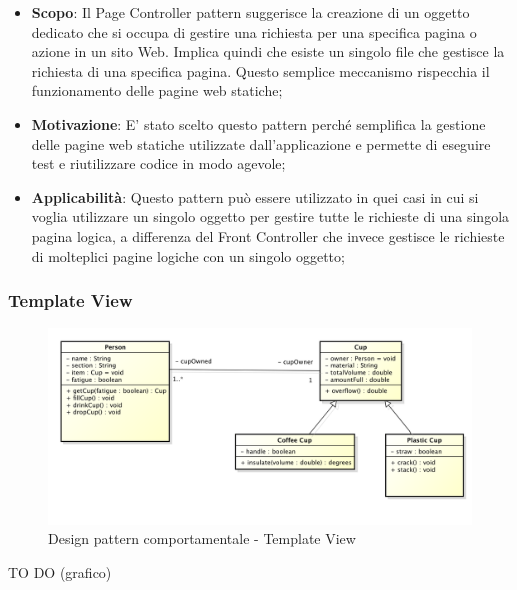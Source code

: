 		
		\begin{itemize}
			\item \textbf{Scopo}: Il Page Controller pattern suggerisce la creazione di un oggetto dedicato che si occupa di gestire una richiesta per una specifica pagina o azione in un sito Web. Implica quindi che esiste un singolo file che gestisce la richiesta di una specifica pagina. Questo semplice meccanismo rispecchia il funzionamento delle pagine web statiche;
					
			\item \textbf{Motivazione}: E' stato scelto questo pattern perché semplifica la gestione delle pagine web statiche utilizzate dall'applicazione e permette di eseguire test e riutilizzare codice in modo agevole;
			
			\item \textbf{Applicabilità}: Questo pattern può essere utilizzato in quei casi in cui si voglia utilizzare un singolo oggetto per gestire tutte le richieste di una singola pagina logica, a differenza del Front Controller che invece gestisce le richieste di molteplici pagine logiche con un singolo oggetto;
			
		\end{itemize}
		
		
		\newpage
		\subsubsection{Template View} %
		
		
		\begin{figure}[htbp]
			\centering
			\centerline{\includegraphics[scale=0.3]{./images/example_graph.png}}
			\caption{Design pattern comportamentale - Template View}
		\end{figure}
		TO DO (grafico)
		
